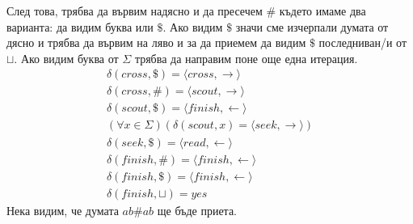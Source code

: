 \documentclass[14pt]{extarticle}
\begin{document}
След това, трябва да вървим надясно и да пресечем \(\#\) където имаме два варианта:
да видим буква или \(\$\). Ако видим \(\$\) значи сме изчерпали думата от дясно и трябва да вървим на ляво и за да приемем да видим \(\$\) последниван/и от \(\sqcup\). Ако видим буква от \(\Sigma\) трябва да направим поне още една итерация.
\begin{align*}
    \delta(cross, \$) = \langle cross, \rightarrow \rangle \\
    \delta(cross, \#) = \langle scout, \rightarrow \rangle \\
    \delta(scout, \$) = \langle finish, \leftarrow \rangle \\
    (\forall x \in \Sigma)(\delta(scout, x) =  \langle seek, \rightarrow \rangle ) \\
    \delta(seek, \$) = \langle read, \leftarrow \rangle \\
    \delta(finish, \#) = \langle finish, \leftarrow \rangle \\
    \delta(finish, \$) = \langle finish, \leftarrow \rangle \\
    \delta(finish, \sqcup) = yes
\end{align*}
Нека видим, че думата \(ab \# ab\) ще бъде приета.
\end{document}

